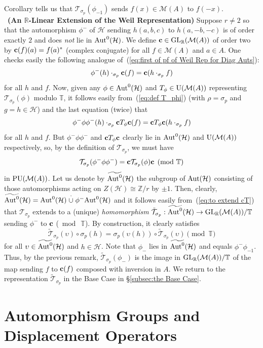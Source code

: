 \documentclass[12pt]{article}
\newcommand{\Aut}{{\rm Aut}}
\newcommand{\bc}{\ensuremath{{\bf c}}}
\newcommand{\bbR}{\ensuremath{\mathbb{R}}}
\newcommand{\bbT}{\ensuremath{\mathbb{T}}}
\newcommand{\bbZ}{\ensuremath{\mathbb{Z}}}
\newcommand{\cH}{\ensuremath{\mathcal{H}}}
\newcommand{\cM}{\mathcal{M}}
\newcommand{\cT}{\ensuremath{\mathcal{T}}}
\newcommand{\GL}{{\rm GL}}
\renewcommand{\rem}{\refstepcounter{rem}\noindent{\sc Remark \therem}}
\renewcommand{\t}[1]{\tilde{#1}}
\renewcommand{\therem}{\thesection.\arabic{rem}}
\newcommand{\U}{{\rm U}}
\newcommand{\Zover}[1]{\ensuremath{\bbZ/#1}}
\begin{document}
Corollary 
tells us that $\cT_{\sigma_p}(\phi_{-1})$ sends $f(x)\in{\cM(A)}$ to $f(-x)$.\bigskip\\
\rem\label{rem:R-lin extn of Weil}\ {\bf (An $\bbR$-Linear Extension of the Weil Representation)}
Suppose $r \neq 2$ so that the automorphism $\phi^-$ of $\cH$ sending $h(a,b,c)$ to $h(a,-b,-c)$ is of order exactly $2$ and does \textit{not} lie in $\Aut^0(\cH)$. We define $\bc\in \GL_\bbR(\cM(A))$ of order two by $\bc(f)(a)=f(a)^\ast$ (complex conjugate) for all $f\in\cM(A)$ and $a\in A$. One checks easily the following analogue of~(\ref{eq:first of pf of  Weil Rep for Diag Auts}):
$$
	\phi^-(h)\cdot_{\sigma_{p}} \bc(f) =  \bc  (h\cdot_{\sigma_p} f)
$$
for all $h$ and $f$. Now, given any $\phi\in\Aut^0(\cH)$ and $T_\phi\in\U(\cM(A))$ representing $\cT_{\sigma_p}(\phi)$ modulo $\bbT$, it follows easily  from~(\ref{eq:def T_phi}) (with $\rho=\sigma_p$ and $g=h\in\cH$) and the last equation (twice) that   
$$
\phi^-\phi\phi^-(h)\cdot_{\sigma_{p}} \bc T_\phi \bc(f) =  \bc T_\phi \bc  (h\cdot_{\sigma_p} f)
$$
for all $h$ and $f$. But $\phi^-\phi\phi^-$ and $\bc T_\phi \bc$ clearly lie in $\Aut^0(\cH)$ and $\U(\cM(A))$ respectively, so, by the definition of $\cT_{\sigma_p}$, we must have 
\begin{equation}\label{eq:to extend cT}
	\cT_{\sigma_p}(\phi^-\phi\phi^-)=\bc \cT_{\sigma_p}(\phi)\bc
	\pmod{\bbT}
\end{equation}
in  ${\rm PU}(\cM(A))$. Let us denote by $\widetilde{\Aut^0}(\cH)$ the subgroup of $\Aut(\cH)$ consisting of those automorphisms acting on $Z(\cH)\cong\Zover{r}$ by $\pm 1$. Then, clearly, $\widetilde{\Aut^0}(\cH)=\Aut^0(\cH)\stackrel{\cdot}{\cup} \phi^-\Aut^0(\cH)$ and it follows easily from~(\ref{eq:to extend cT})  that $\cT_{\sigma_p}$ extends to a (unique)  \textit{homomorphism} $\t \cT_{\sigma_p}:\widetilde{\Aut^0}(\cH)\rightarrow\GL_\bbR(\cM(A))/\bbT$ sending $\phi^-$ to  $\bc$ ($\bmod\ \bbT$). By construction, it clearly satisfies 
$$
	\t \cT_{\sigma_p}(\upsilon)\circ\sigma_p(h)= \sigma_p(\upsilon(h))\circ \t \cT_{\sigma_p}(\upsilon)
	\pmod{\bbT}
$$
for all $\upsilon\in\widetilde{\Aut^0}(\cH)$ and $h\in \cH$. Note that $\phi_-$ lies in $\widetilde{\Aut^0}(\cH)$ and equals $\phi^-\phi_{-1}$. Thus, by the previous remark, $\t \cT_{\sigma_p}(\phi_-)$  is the image in $\GL_\bbR(\cM(A))/\bbT$  of the map sending $f$ to $\bc(f)$ composed with inversion in $A$. We return to the  representation
$\t \cT_{\sigma_p}$ in the Base Case in \S\ref{subsec:the Base Case}.
\section{Automorphism Groups and Displacement Operators}\label{sec:Aut Gps}
\end{document}

